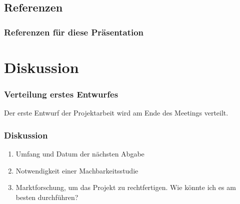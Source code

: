 \documentclass{beamer}
\begin{document}
\subsection{Referenzen}

\begin{frame}[allowframebreaks]
    \frametitle{Referenzen für diese Präsentation}
    \printbibliography

\end{frame}

\section{Diskussion}
\begin{frame}
    \frametitle{Verteilung erstes Entwurfes}
    Der erste Entwurf der Projektarbeit wird am Ende des Meetings verteilt. 
\end{frame}

\begin{frame}
    \frametitle{Diskussion}
    \begin{enumerate}
        \item Umfang und Datum der nächsten Abgabe
        \item Notwendigkeit einer Machbarkeitsstudie
        \item Marktforschung, um das Projekt zu rechtfertigen. Wie könnte ich es am besten durchführen?
    \end{enumerate}

\end{frame}
\end{document}
